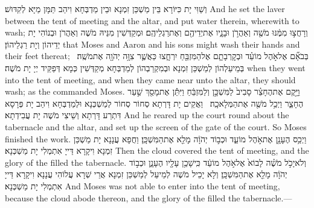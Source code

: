 {וְשַׁוִּי יָת כִּיּוֹרָא בֵּין מַשְׁכַּן זִמְנָא וּבֵין מַדְבְּחָא וִיהַב תַּמָּן מַיָּא לְקִדּוּשׁ׃}
{And he set the laver between the tent of meeting and the altar, and put water therein, wherewith to wash;}{}
{וְרָחֲצ֣וּ מִמֶּ֔נּוּ מֹשֶׁ֖ה וְאַהֲרֹ֣ן וּבָנָ֑יו אֶת\maqqaf יְדֵיהֶ֖ם וְאֶת\maqqaf רַגְלֵיהֶֽם׃}
{וּמְקַדְּשִׁין מִנֵּיהּ מֹשֶׁה וְאַהֲרֹן וּבְנוֹהִי יָת יְדֵיהוֹן וְיָת רַגְלֵיהוֹן׃}
{that Moses and Aaron and his sons might wash their hands and their feet thereat;}{}
{בְּבֹאָ֞ם אֶל\maqqaf אֹ֣הֶל מוֹעֵ֗ד וּבְקׇרְבָתָ֛ם אֶל\maqqaf הַמִּזְבֵּ֖חַ יִרְחָ֑צוּ כַּאֲשֶׁ֛ר צִוָּ֥ה יְהֹוָ֖ה אֶת\maqqaf מֹשֶֽׁה׃ \setuma }
{בְּמֵיעַלְהוֹן לְמַשְׁכַּן זִמְנָא וּבְמִקְרַבְהוֹן לְמַדְבְּחָא מְקַדְּשִׁין כְּמָא דְּפַקֵּיד יְיָ יָת מֹשֶׁה׃}
{when they went into the tent of meeting, and when they came near unto the altar, they should wash; as the \lord\space commanded Moses.}{}
{וַיָּ֣קֶם אֶת\maqqaf הֶחָצֵ֗ר סָבִיב֙ לַמִּשְׁכָּ֣ן וְלַמִּזְבֵּ֔חַ וַיִּתֵּ֕ן אֶת\maqqaf מָסַ֖ךְ שַׁ֣עַר הֶחָצֵ֑ר וַיְכַ֥ל מֹשֶׁ֖ה אֶת\maqqaf הַמְּלָאכָֽה׃ \petucha }
{וַאֲקֵים יָת דָּרְתָא סְחוֹר סְחוֹר לְמַשְׁכְּנָא וּלְמַדְבְּחָא וִיהַב יָת פְּרָסָא דִּתְרַע דָּרְתָא וְשֵׁיצִי מֹשֶׁה יָת עֲבִידְתָא׃}
{And he reared up the court round about the tabernacle and the altar, and set up the screen of the gate of the court. So Moses finished the work.}{}
{וַיְכַ֥ס הֶעָנָ֖ן אֶת\maqqaf אֹ֣הֶל מוֹעֵ֑ד וּכְב֣וֹד יְהֹוָ֔ה מָלֵ֖א אֶת\maqqaf הַמִּשְׁכָּֽן׃}
{וַחֲפָא עֲנָנָא יָת מַשְׁכַּן זִמְנָא וִיקָרָא דַּייָ אִתְמְלִי יָת מַשְׁכְּנָא׃}
{Then the cloud covered the tent of meeting, and the glory of the \lord\space filled the tabernacle.}{}
{וְלֹא\maqqaf יָכֹ֣ל מֹשֶׁ֗ה לָבוֹא֙ אֶל\maqqaf אֹ֣הֶל מוֹעֵ֔ד כִּֽי\maqqaf שָׁכַ֥ן עָלָ֖יו הֶעָנָ֑ן וּכְב֣וֹד יְהֹוָ֔ה מָלֵ֖א אֶת\maqqaf הַמִּשְׁכָּֽן׃}
{וְלָא יָכֵיל מֹשֶׁה לְמֵיעַל לְמַשְׁכַּן זִמְנָא אֲרֵי שְׁרָא עֲלוֹהִי עֲנָנָא וִיקָרָא דַּייָ אִתְמְלִי יָת מַשְׁכְּנָא׃}
{And Moses was not able to enter into the tent of meeting, because the cloud abode thereon, and the glory of the \lord\space filled the tabernacle.—}{}
